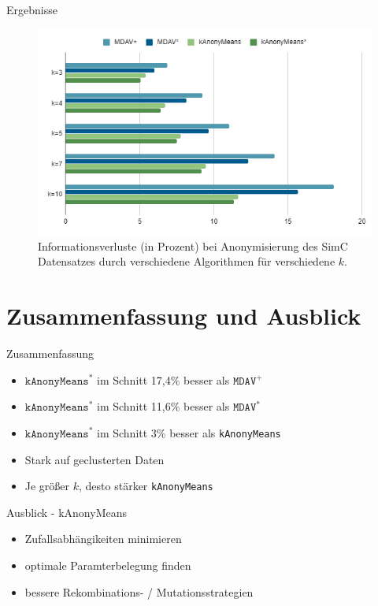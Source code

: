 \documentclass[10pt,table]{beamer}
\newcommand{\kanonymeans}{\texttt{kAnonyMeans}\xspace}
\newcommand{\kanonymeansstar}{$\texttt{kAnonyMeans}^*$\xspace}
\newcommand{\mdav}{\texttt{MDAV}\xspace}
\newcommand{\mdavplus}{$\mdav^+$\xspace}
\newcommand{\mdavstar}{$\mdav^*$\xspace}
\begin{document}
\begin{frame}{Ergebnisse}
    \begin{figure}[H]
        \centering
        \includegraphics[scale=0.35]{Images/kAnonyMeansStarSimC.png}
        \caption{Informationsverluste (in Prozent) bei Anonymisierung des SimC Datensatzes durch verschiedene Algorithmen für verschiedene $k$.}
    \end{figure}
\end{frame}

\section{Zusammenfassung und Ausblick}
\begin{frame}{Zusammenfassung}
    \begin{itemize}
        \item \kanonymeansstar im Schnitt 17,4\% besser als \mdavplus
        \item \kanonymeansstar im Schnitt 11,6\% besser als \mdavstar
        \item \kanonymeansstar im Schnitt 3\% besser als \kanonymeans
        \item Stark auf geclusterten Daten
        \item Je größer $k$, desto stärker \kanonymeans
    \end{itemize}
\end{frame}

\begin{frame}{Ausblick - kAnonyMeans}
    \begin{itemize}
        \item Zufallsabhängikeiten minimieren
        \item optimale Paramterbelegung finden
        \item bessere Rekombinations- / Mutationsstrategien
    \end{itemize}
\end{frame}
\end{document}
